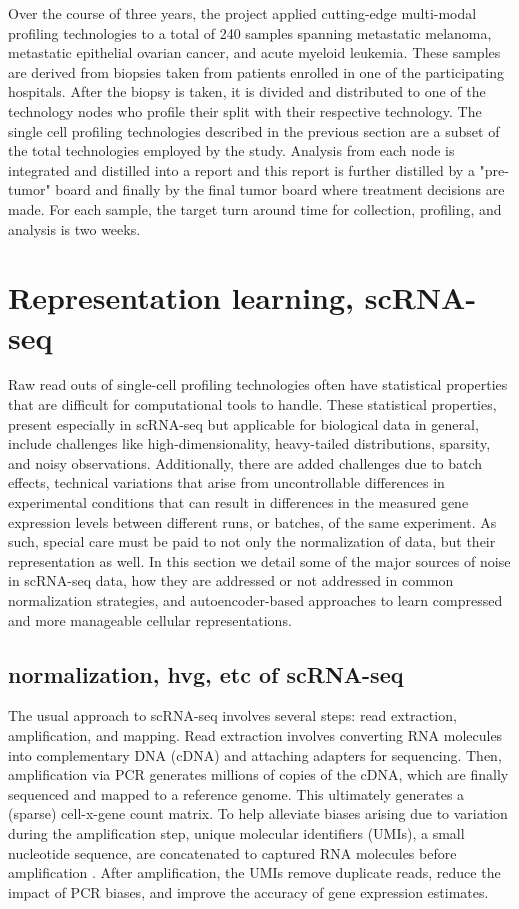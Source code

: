 Over the course of three years, the project applied cutting-edge multi-modal profiling technologies to a total of 240 samples spanning metastatic melanoma, metastatic epithelial ovarian cancer, and acute myeloid leukemia.
These samples are derived from biopsies taken from patients enrolled in one of the participating hospitals.
After the biopsy is taken, it is divided and distributed to one of the technology nodes who profile their split with their respective technology.
The single cell profiling technologies described in the previous section are a subset of the total technologies employed by the study.
Analysis from each node is integrated and distilled into a report and 
this report is further distilled by a "pre-tumor" board and finally by the final tumor board where treatment decisions are made.
For each sample, the target turn around time for collection, profiling, and analysis is two weeks.

\section{Representation learning, scRNA-seq}
Raw read outs of single-cell profiling technologies often have statistical properties that are difficult for computational tools to handle.
These statistical properties, present especially in scRNA-seq but applicable for biological data in general,
include challenges like high-dimensionality, heavy-tailed distributions, sparsity, and noisy observations.
Additionally, there are added challenges due to batch effects, 
technical variations that arise from uncontrollable differences in experimental conditions that can result in differences in the measured gene expression levels between different runs, or batches, of the same experiment.
As such, special care must be paid to not only the normalization of data, but their representation as well.
In this section we detail some of the major sources of noise in scRNA-seq data, how they are addressed or not addressed in common normalization strategies, and autoencoder-based approaches to learn compressed and more manageable cellular representations.

\subsection{normalization, hvg, etc of scRNA-seq}
The usual approach to scRNA-seq involves several steps: read extraction, amplification, and mapping.
Read extraction involves converting RNA molecules into complementary DNA (cDNA) and attaching adapters for sequencing.
Then, amplification via PCR generates millions of copies of the cDNA, which are finally sequenced and mapped to a reference genome.
This ultimately generates a (sparse) cell-x-gene count matrix.
To help alleviate biases arising due to variation during the amplification step, unique molecular identifiers (UMIs), a small nucleotide sequence, are concatenated to captured RNA molecules before amplification \cite{islam2014}.
After amplification, the UMIs remove duplicate reads, reduce the impact of PCR biases, and improve the accuracy of gene expression estimates.


